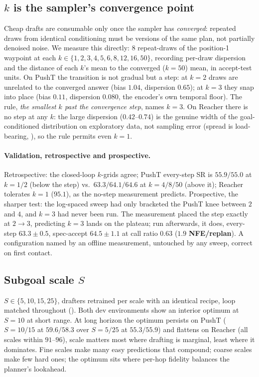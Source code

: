 \documentclass{article}
\begin{document}
\subsection{$k$ is the sampler's convergence point}
\label{sec:calib-k}
Cheap drafts are consumable only once the sampler has \emph{converged}: repeated
draws from identical conditioning must be versions of the same plan, not partially
denoised noise. We measure this directly: $8$ repeat-draws of the position-1
waypoint at each $k\in\{1,2,3,4,5,6,8,12,16,50\}$, recording per-draw dispersion and
the distance of each $k$'s mean to the converged ($k{=}50$) mean, in accept-test
units. On PushT the transition is not gradual but a step: at $k{=}2$ draws are
unrelated to the converged answer (bias $1.04$, dispersion $0.65$); at $k{=}3$ they
snap into place (bias $0.11$, dispersion $0.080$, the encoder's own temporal
floor). The rule, \emph{the smallest $k$ past the convergence step}, names
$k{=}3$. On Reacher there is no step at any $k$: the large dispersion
($0.42$--$0.74$) is the genuine width of the goal-conditioned distribution on
exploratory data, not sampling error (spread is load-bearing, ),
so the rule permits even $k{=}1$.

\paragraph{Validation, retrospective and prospective.} Retrospective: the
closed-loop $k$-grids agree; PushT every-step SR is $55.9/55.0$ at $k{=}1/2$
(below the step) vs.\ $63.3/64.1/64.6$ at $k{=}4/8/50$ (above it); Reacher tolerates
$k{=}1$ ($95.1$), as the no-step measurement predicts. Prospective, the sharper
test: the log-spaced sweep had only bracketed the PushT knee between $2$ and $4$,
and $k{=}3$ had never been run. The measurement placed the step exactly at
$2{\to}3$, predicting $k{=}3$ lands on the plateau; run afterwards, it does, every-step $63.3{\pm}0.5$, spec-accept $64.5{\pm}1.1$ at call ratio $0.63$
($\mathbf{1.9}$ \textbf{NFE/replan}). A configuration named by an offline
measurement, untouched by any sweep, correct on first contact.

\subsection{Subgoal scale $S$}
\label{sec:calib-scale}
$S\in\{5,10,15,25\}$, drafters retrained per scale with an identical recipe, loop
matched throughout (). Both dev environments show an interior
optimum at $S{=}10$ at short range. At long horizon the optimum persists on PushT
($S{=}10/15$ at $59.6/58.3$ over $S{=}5/25$ at $55.3/55.9$) and flattens on Reacher
(all scales within $91$--$96$), scale matters most where drafting is marginal,
least where it dominates. Fine scales make many easy predictions that compound;
coarse scales make few hard ones; the optimum sits where per-hop fidelity balances
the planner's lookahead.
\end{document}
